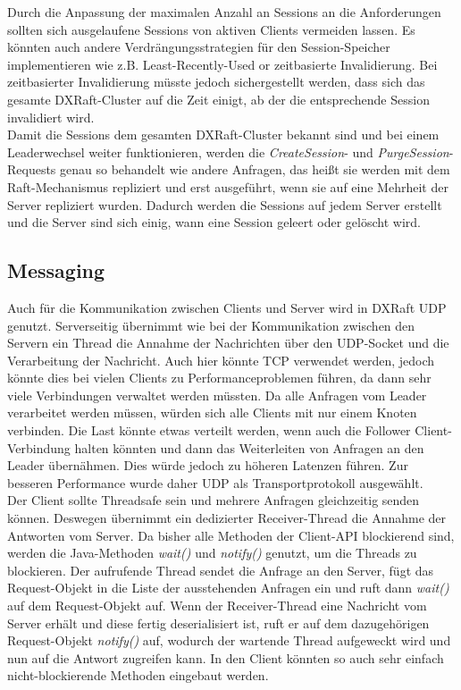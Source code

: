 Durch die Anpassung der maximalen Anzahl an Sessions an die Anforderungen sollten sich ausgelaufene Sessions von aktiven Clients vermeiden lassen. Es könnten auch andere Verdrängungsstrategien für den Session-Speicher implementieren wie z.B. Least-Recently-Used or zeitbasierte Invalidierung. Bei zeitbasierter Invalidierung müsste jedoch sichergestellt werden, dass sich das gesamte DXRaft-Cluster auf die Zeit einigt, ab der die entsprechende Session invalidiert wird. \\
Damit die Sessions dem gesamten DXRaft-Cluster bekannt sind und bei einem Leaderwechsel weiter funktionieren, werden die \textit{CreateSession}- und \textit{PurgeSession}-Requests genau so behandelt wie andere Anfragen, das heißt sie werden mit dem Raft-Mechanismus repliziert und erst ausgeführt, wenn sie auf eine Mehrheit der Server repliziert wurden. Dadurch werden die Sessions auf jedem Server erstellt und die Server sind sich einig, wann eine Session geleert oder gelöscht wird.

\subsection{Messaging}
\label{client-messaging}

Auch für die Kommunikation zwischen Clients und Server wird in DXRaft UDP genutzt. Serverseitig übernimmt wie bei der Kommunikation zwischen den Servern ein Thread die Annahme der Nachrichten über den UDP-Socket und die Verarbeitung der Nachricht. Auch hier könnte TCP verwendet werden, jedoch könnte dies bei vielen Clients zu Performanceproblemen führen, da dann sehr viele Verbindungen verwaltet werden müssten. Da alle Anfragen vom Leader verarbeitet werden müssen, würden sich alle Clients mit nur einem Knoten verbinden. Die Last könnte etwas verteilt werden, wenn auch die Follower Client-Verbindung halten könnten und dann das Weiterleiten von Anfragen an den Leader übernähmen. Dies würde jedoch zu höheren Latenzen führen. Zur besseren Performance wurde daher UDP als Transportprotokoll ausgewählt. \\
Der Client sollte Threadsafe sein und mehrere Anfragen gleichzeitig senden können. Deswegen übernimmt ein dedizierter Receiver-Thread die Annahme der Antworten vom Server. Da bisher alle Methoden der Client-API blockierend sind, werden die Java-Methoden \textit{wait()} und  \textit{notify()} genutzt, um die Threads zu blockieren. Der aufrufende Thread sendet die Anfrage an den Server, fügt das Request-Objekt in die Liste der ausstehenden Anfragen ein und ruft dann \textit{wait()} auf dem Request-Objekt auf. Wenn der Receiver-Thread eine Nachricht vom Server erhält und diese fertig deserialisiert ist, ruft er auf dem dazugehörigen Request-Objekt \textit{notify()} auf, wodurch der wartende Thread aufgeweckt wird und nun auf die Antwort zugreifen kann. In den Client könnten so auch sehr einfach nicht-blockierende Methoden eingebaut werden.

